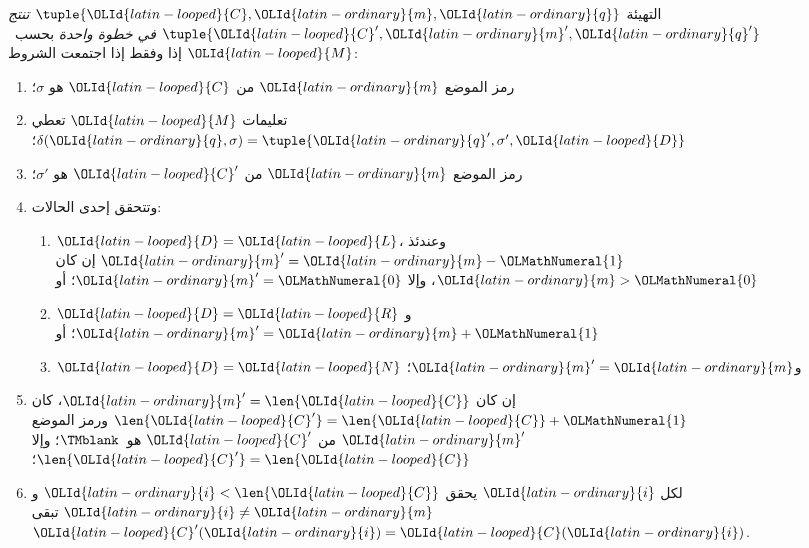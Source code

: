 \documentclass[../../../include/open-logic-section]{subfiles}
\begin{document}
\begin{defn}
التهيئة $\tuple{\OLId{latin-looped}{C},\OLId{latin-ordinary}{m},\OLId{latin-ordinary}{q}}$ \emph{تنتج $\tuple{\OLId{latin-looped}{C}',\OLId{latin-ordinary}{m}',\OLId{latin-ordinary}{q}'}$ في خطوة واحدة} بحسب~$\OLId{latin-looped}{M}$ إذا وفقط إذا اجتمعت الشروط:
\begin{enumerate}
\item رمز الموضع $\OLId{latin-ordinary}{m}$ من $\OLId{latin-looped}{C}$ هو $\sigma$؛
\item تعليمات $\OLId{latin-looped}{M}$ تعطي $\delta(\OLId{latin-ordinary}{q},\sigma)=
  \tuple{\OLId{latin-ordinary}{q}',\sigma',\OLId{latin-looped}{D}}$؛
\item رمز الموضع $\OLId{latin-ordinary}{m}$ من $\OLId{latin-looped}{C}'$ هو $\sigma'$؛
\item وتتحقق إحدى الحالات:
\begin{enumerate}
\item $\OLId{latin-looped}{D}=\OLId{latin-looped}{L}$، وعندئذ $\OLId{latin-ordinary}{m}'=\OLId{latin-ordinary}{m}-\OLMathNumeral{1}$ إن كان $\OLId{latin-ordinary}{m}>\OLMathNumeral{0}$، وإلا $\OLId{latin-ordinary}{m}'=\OLMathNumeral{0}$؛ أو
\item $\OLId{latin-looped}{D}=\OLId{latin-looped}{R}$ و$\OLId{latin-ordinary}{m}'=\OLId{latin-ordinary}{m}+\OLMathNumeral{1}$؛ أو
\item $\OLId{latin-looped}{D}=\OLId{latin-looped}{N}$ و$\OLId{latin-ordinary}{m}'=\OLId{latin-ordinary}{m}$؛
\end{enumerate}
\item إن كان $\OLId{latin-ordinary}{m}'=\len{\OLId{latin-looped}{C}}$، كان $\len{\OLId{latin-looped}{C}'}=\len{\OLId{latin-looped}{C}}+\OLMathNumeral{1}$ ورمز الموضع $\OLId{latin-ordinary}{m}'$ من $\OLId{latin-looped}{C}'$ هو~$\TMblank$؛ وإلا $\len{\OLId{latin-looped}{C}'}=\len{\OLId{latin-looped}{C}}$؛
\item لكل $\OLId{latin-ordinary}{i}$ يحقق $\OLId{latin-ordinary}{i}<\len{\OLId{latin-looped}{C}}$ و$\OLId{latin-ordinary}{i}\neq \OLId{latin-ordinary}{m}$ تبقى $\OLId{latin-looped}{C}'(\OLId{latin-ordinary}{i})=\OLId{latin-looped}{C}(\OLId{latin-ordinary}{i})$.
\end{enumerate}
\end{defn}
\end{document}

